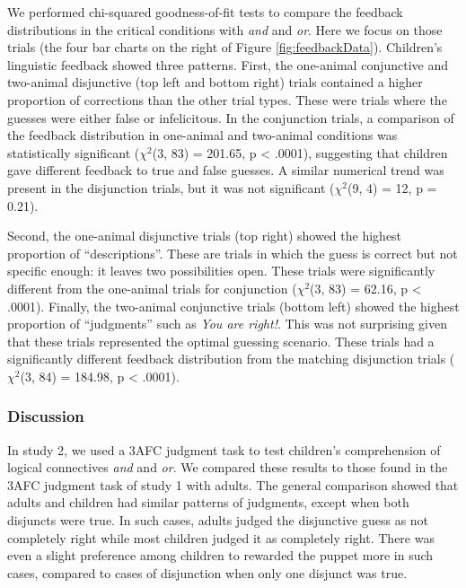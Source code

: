 \documentclass[floatsintext,man]{apa6}
\theoremstyle{definition}
\theoremstyle{definition}
\theoremstyle{definition}
\theoremstyle{remark}
\begin{document}
We performed chi-squared goodness-of-fit tests to compare the feedback
distributions in the critical conditions with \emph{and} and \emph{or}.
Here we focus on those trials (the four bar charts on the right of
Figure \ref{fig:feedbackData}). Children's linguistic feedback showed
three patterns. First, the one-animal conjunctive and two-animal
disjunctive (top left and bottom right) trials contained a higher
proportion of corrections than the other trial types. These were trials
where the guesses were either false or infelicitous. In the conjunction
trials, a comparison of the feedback distribution in one-animal and
two-animal conditions was statistically significant (\(\chi^2\)(3, 83) =
201.65, p \textless{} .0001), suggesting that children gave different
feedback to true and false guesses. A similar numerical trend was
present in the disjunction trials, but it was not significant
(\(\chi^2\)(9, 4) = 12, p = 0.21).

Second, the one-animal disjunctive trials (top right) showed the highest
proportion of \enquote{descriptions}. These are trials in which the
guess is correct but not specific enough: it leaves two possibilities
open. These trials were significantly different from the one-animal
trials for conjunction (\(\chi^2\)(3, 83) = 62.16, p \textless{} .0001).
Finally, the two-animal conjunctive trials (bottom left) showed the
highest proportion of \enquote{judgments} such as \emph{You are right!}.
This was not surprising given that these trials represented the optimal
guessing scenario. These trials had a significantly different feedback
distribution from the matching disjunction trials (\(\chi^2\)(3, 84) =
184.98, p \textless{} .0001).

\subsubsection{Discussion}\label{discussion-1}

In study 2, we used a 3AFC judgment task to test children's
comprehension of logical connectives \emph{and} and \emph{or}. We
compared these results to those found in the 3AFC judgment task of study
1 with adults. The general comparison showed that adults and children
had similar patterns of judgments, except when both disjuncts were true.
In such cases, adults judged the disjunctive guess as not completely
right while most children judged it as completely right. There was even
a slight preference among children to rewarded the puppet more in such
cases, compared to cases of disjunction when only one disjunct was true.
\end{document}
